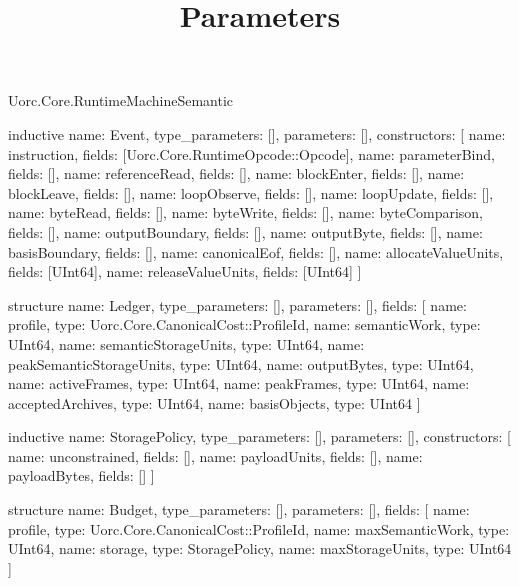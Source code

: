 \begin{lexlean}{Uorc.Core.RuntimeMachineSemantic}





\title{Parameters}

\begin{semanticmodule}
inductive{
  name: Event,
  type_parameters: [],
  parameters: [],
  constructors: [
    {name: instruction, fields: [Uorc.Core.RuntimeOpcode::Opcode]},
    {name: parameterBind, fields: []},
    {name: referenceRead, fields: []},
    {name: blockEnter, fields: []},
    {name: blockLeave, fields: []},
    {name: loopObserve, fields: []},
    {name: loopUpdate, fields: []},
    {name: byteRead, fields: []},
    {name: byteWrite, fields: []},
    {name: byteComparison, fields: []},
    {name: outputBoundary, fields: []},
    {name: outputByte, fields: []},
    {name: basisBoundary, fields: []},
    {name: canonicalEof, fields: []},
    {name: allocateValueUnits, fields: [UInt64]},
    {name: releaseValueUnits, fields: [UInt64]}
  ]
}

structure{
  name: Ledger,
  type_parameters: [],
  parameters: [],
  fields: [
    {name: profile, type: Uorc.Core.CanonicalCost::ProfileId},
    {name: semanticWork, type: UInt64},
    {name: semanticStorageUnits, type: UInt64},
    {name: peakSemanticStorageUnits, type: UInt64},
    {name: outputBytes, type: UInt64},
    {name: activeFrames, type: UInt64},
    {name: peakFrames, type: UInt64},
    {name: acceptedArchives, type: UInt64},
    {name: basisObjects, type: UInt64}
  ]
}

inductive{
  name: StoragePolicy,
  type_parameters: [],
  parameters: [],
  constructors: [
    {name: unconstrained, fields: []},
    {name: payloadUnits, fields: []},
    {name: payloadBytes, fields: []}
  ]
}

structure{
  name: Budget,
  type_parameters: [],
  parameters: [],
  fields: [
    {name: profile, type: Uorc.Core.CanonicalCost::ProfileId},
    {name: maxSemanticWork, type: UInt64},
    {name: storage, type: StoragePolicy},
    {name: maxStorageUnits, type: UInt64}
  ]
}


\end{semanticmodule}
\end{lexlean}
